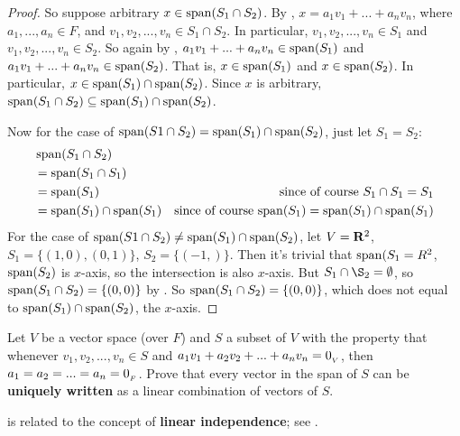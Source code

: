 \begin{proof}
So suppose arbitrary \(x \in \operatorname{span}(S_1 \cap S_2)\).
By , \(x = a_1 v_1 + ... + a_n v_n\), where \(a_1, ..., a_n \in F\), and \(v_1, v_2, ..., v_n \in S_1 \cap S_2\).
In particular, \(v_1, v_2, ..., v_n \in S_1\) and \(v_1, v_2, ..., v_n \in S_2\).
So again by , \(a_1 v_1 + ... + a_n v_n \in \operatorname{span}(S_1)\) and \(a_1 v_1 + ... + a_n v_n \in \operatorname{span}(S_2)\).
That is, \(x \in \operatorname{span}(S_1)\) and \(x \in \operatorname{span}(S_2)\).
In particular, \(x \in \operatorname{span}(S_1) \cap \operatorname{span}(S_2)\).
Since \(x\) is arbitrary, \(\operatorname{span}(S_1 \cap S_2) \subseteq \operatorname{span}(S_1) \cap \operatorname{span}(S_2)\).

Now for the case of \(\operatorname{span}(S1 \cap S_2) = \operatorname{span}(S_1) \cap \operatorname{span}(S_2)\), just let \(S_1 = S_2\):
\begin{align*}
    & \operatorname{span}(S_1 \cap S_2) \\
    & = \operatorname{span}(S_1 \cap S_1) \\
    & = \operatorname{span}(S_1) & \text{since of course \(S_1 \cap S_1 = S_1\)} \\
    & = \operatorname{span}(S_1) \cap \operatorname{span}(S_1) & \text{since of course \(\operatorname{span}(S_1) = \operatorname{span}(S_1) \cap \operatorname{span}(S_1)\)}
\end{align*}
For the case of \(\operatorname{span}(S1 \cap S_2) \ne \operatorname{span}(S_1) \cap \operatorname{span}(S_2)\), let \(V = \mathbf{R}^2\), \(S_1 = \{(1, 0), (0, 1)\}\), \(S_2 = \{(-1, )\}\).
Then it's trivial that \(\operatorname{span}(S_1 = R^2\), \(\operatorname{span}(S_2)\) is \(x\)-axis, so the intersection is also \(x\)-axis.
But \(S_1 \cap \S_2 = \emptyset\), so \(\operatorname{span}(S_1 \cap S_2) = \{ (0, 0) \}\) by .
So \(\operatorname{span}(S_1 \cap S_2) = \{ (0, 0) \}\), which does not equal to \(\operatorname{span}(S_1) \cap \operatorname{span}(S_2)\), the \(x\)-axis.
\end{proof}

\begin{exercise} \label{exercise 1.4.16}
Let \(V\) be a vector space (over \(F\)) and \(S\) a subset of \(V\) with the property that whenever \(v_1, v_2, ..., v_n \in S\) and \(a_1 v_1 + a_2 v_2 + ... + a_n v_n = 0_{_V}\), then \(a_1 = a_2 = ... = a_n = 0_{_F}\).
Prove that every vector in the span of \(S\) can be \textbf{uniquely written} as a linear combination of vectors of \(S\).
\end{exercise}

\begin{note}
 is related to the concept of \textbf{linear independence}; see .
\end{note}

